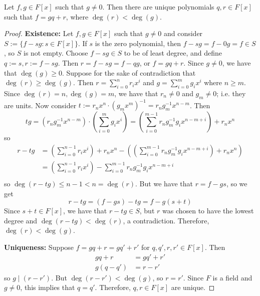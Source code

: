 \documentclass [12pt] {article}
\newenvironment{theorem}[1]{\begin{tcolorbox}[title={Theorem #1},colback=green!5!white,colframe=black!75!green]}{\end{tcolorbox}}
\renewcommand{\bf}[1]{\textbf{{#1}}}
\begin{document}
\newpage
\begin{theorem}{(Division Algorithm [Polynomials])}
    Let $f, g \in F[x]$ such that $g \neq 0$. Then there are unique polynomials $q, r \in F[x]$ such
    that $f = gq + r$, where $\deg(r) < \deg(g)$.
\end{theorem}
\begin{proof}
    \bf{Existence:}
    Let $f, g \in F[x]$ such that $g \neq 0$ and consider $S := \{ f - sg : s \in F[x] \}$. If $s$
    is the zero polynomial, then $f - sg = f - 0g = f \in S$, so $S$ is not empty.
    Choose $f - sg \in S$ to be of least degree, and define $q := s, r := f - sg$. Then
    $r = f - sg = f - qg$, or $f = gq + r$. Since $g \neq 0$, we have that $\deg(g) \geq 0$. Suppose
    for the sake of contradiction that $\deg(r) \geq \deg(g)$. Then
    $r = \sum\limits_{i = 0}^{n} r_i x^i$ and $g = \sum\limits_{i = 0}^{m} g_i x^i$ where $n \geq m$.
    Since $\deg(r) = n, \deg(g) = m$, we have that  $r_n \neq 0$ and $g_m \neq 0$;
    i.e. they are units. Now consider
    $t := r_n x^n \cdot (g_m x^m)^{-1} = r_n g_m^{-1} x^{n - m}$. Then
    \[
        tg = \left(r_n g_m^{-1} x^{n - m}\right) \cdot \left(\sum\limits_{i = 0}^{m} g_i x^i\right)
        =
        \left(\sum\limits_{i = 0}^{m - 1} r_n g_m^{-1} g_i x^{n - m + i}\right) +
        r_n x^n
    \]
    so
    \begin{align*}
        r - tg &= \left(\sum\limits_{i = 0}^{n - 1} r_i x^i\right) + r_n x^n -
        \left(\left(\sum\limits_{i = 0}^{m - 1} r_n g_m^{-1} g_i x^{n - m + i}\right) +
        r_n x^n\right) \\
               &= \left(\sum\limits_{i = 0}^{n - 1} r_i x^i\right) -
               \sum\limits_{i = 0}^{m - 1} r_n g_m^{-1} g_i x^{n - m + i} \\
    \end{align*}
    so $\deg(r - tg) \leq n - 1 < n = \deg(r)$. But we have that
    $r = f - gs$, so we get
    \[
        r - tg = (f - gs) - tg = f - g(s + t)
    \]
    Since $s + t \in F[x]$, we have that $r - tg \in S$, but $r$ was chosen to have the lowest
    degree and $\deg(r - tg) < \deg(r)$, a contradiction. Therefore, $\deg(r) < \deg(g)$.
    \vspace{0.5em}

    \bf{Uniqueness:} Suppose $f = gq + r = gq' + r'$ for $q, q', r, r' \in F[x]$. Then
    \begin{align*}
        gq + r &= gq' + r' \\
        g(q - q') &= r - r'
    \end{align*}
    so $g \mid (r - r')$. But $\deg(r - r') < \deg(g)$, so $r = r'$. Since $F$ is a field and $g
    \neq 0$, this implies that $q = q'$. Therefore, $q, r \in F[x]$ are unique.
\end{proof}
\end{document}
